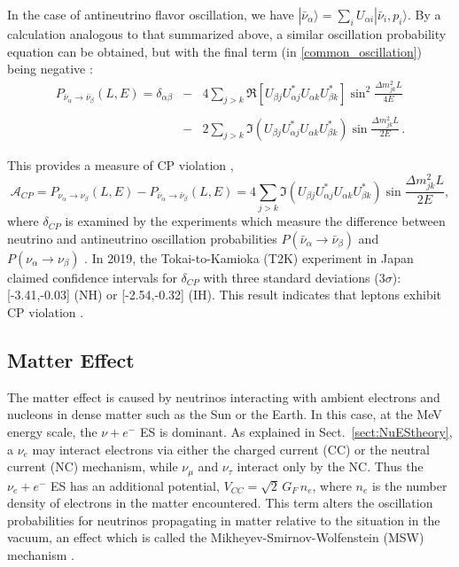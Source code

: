 In the case of antineutrino flavor oscillation, we have $|\bar{\nu}_\alpha\rangle=\sum_i U_{\alpha i}|\bar{\nu}_i,p_i\rangle$. By a calculation analogous to that summarized above, a similar oscillation probability equation can be obtained, but with the final term (in \ref{common_oscillation}) being negative \cite{aitchison2012gauge}:
\begin{eqnarray}\label{antiNu_eq1}
P_{\bar{\nu}_\alpha\to\bar{\nu}_\beta}(L,E)=\delta_{\alpha\beta} &-& 4\sum_{j>k} \Re[U_{\beta j}U^*_{\alpha j}U_{\alpha k}U^*_{\beta k}]\sin^2\frac{\Delta m^2_{jk}L}{4E} \nonumber\\
&\;& \\
&-& 2\sum_{j>k} \Im(U_{\beta j}U^*_{\alpha j}U_{\alpha k}U^*_{\beta k})\sin\frac{\Delta m^2_{jk}L}{2E} \nonumber \, .
\end{eqnarray}

This provides a measure of CP violation \cite{aitchison2012gauge},
\begin{equation}\label{cpV_eq1}
\mathcal{A}_{CP}=P_{\nu_\alpha\to\nu_\beta}(L,E)-P_{\bar{\nu}_\alpha\to\bar{\nu}_\beta}(L,E)=
4\sum_{j>k} \Im(U_{\beta j}U^*_{\alpha j}U_{\alpha k}U^*_{\beta k})\sin\frac{\Delta m^2_{jk}L}{2E},
\end{equation}
where $\delta_{CP}$ is examined by the experiments which measure the difference between neutrino and antineutrino oscillation probabilities $P(\bar{\nu}_\alpha\to\bar{\nu}_\beta)$ and $P(\nu_\alpha\to\nu_\beta)$ \cite{xing2011neutrinos}. In 2019, the Tokai-to-Kamioka (T2K) experiment in Japan claimed confidence intervals for $\delta_{CP}$ with three standard deviations ($3\sigma$): [-3.41,-0.03] (NH) or [-2.54,-0.32] (IH). This result indicates that leptons exhibit CP violation \cite{abe2019constraint}.

\subsection{Matter Effect}\label{sect:MSW}

The matter effect is caused by neutrinos interacting with ambient electrons and nucleons in dense matter such as the Sun or the Earth. In this case, at the MeV energy scale, the $\nu+e^-$ ES is dominant. As explained in Sect.~\ref{sect:NuEStheory}, a $\nu_e$ may interact electrons via either the charged current (CC) or the neutral current (NC) mechanism, while $\nu_\mu$ and $\nu_\tau$ interact only by the NC. Thus the $\nu_e+e^-$ ES has an additional potential, $V_{CC} =\sqrt{2} \, G_F \, n_e$, where $n_e$ is the number density of electrons in the matter encountered. This term alters the oscillation probabilities for neutrinos propagating in matter relative to the situation in the vacuum, an effect which is called the Mikheyev-Smirnov-Wolfenstein (MSW) mechanism \cite{smirnov2016solar,smirnov2005msw}.

